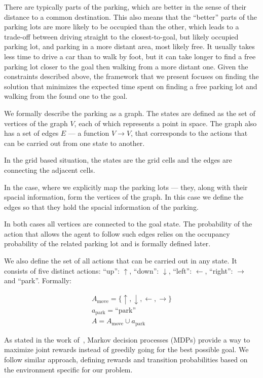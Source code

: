 There are typically parts of the parking, which are better in the sense of
their distance to a common destination. This also means that the ``better''
parts of the parking lots are more likely to be occupied than the other, which
leads to a trade-off between driving straight to the closest-to-goal, but
likely occupied parking lot, and parking in a more distant area, most likely
free. It usually takes less time to drive a car than to walk by foot, but it
can take longer to find a free parking lot closer to the goal then walking
from a more distant one. Given the constraints described above, the framework
that we present focuses on finding the solution that minimizes the expected
time spent on finding a free parking lot and walking from the found one to the
goal.

We formally describe the parking as a graph. The states are defined as the set
of vertices of the graph $V$, each of which represents a point in space. The
graph also has a set of edges $E$ --- a function $V \rightarrow V$, that
corresponds to the actions that can be carried out from one state to another.

In the grid based situation, the states are the grid cells and the edges are
connecting the adjacent cells.

In the case, where we explicitly map the parking lots --- they, along with
their spacial information, form the vertices of the graph. In this case we
define the edges so that they hold the spacial information of the parking.

In both cases all vertices are connected to the goal state. The probability of
the action that allows the agent to follow such edges relies on the occupancy
probability of the related parking lot and is formally defined later.

We also define the set of all actions that can be carried out in any state. It
consists of five distinct actions: ``up'': $\uparrow$, ``down'': $\downarrow$,
``left'': $\leftarrow$, ``right'': $\rightarrow$ and ``park''. Formally:

\begin{eqnarray}
A_{\mbox{move}} = \{ \uparrow, \downarrow, \leftarrow, \rightarrow \} \\
a_{\mbox{park}} = \mbox{``park''} \\
A = A_{\mbox{move}} \cup a_{\mbox{park}}
\end{eqnarray}

As stated in the work of~\citet{tipaldiICRA11}, Markov decision processes
(MDPs) provide a way to maximize joint rewards instead of greedily going for
the best possible goal. We follow similar approach, defining rewards and
transition probabilities based on the environment specific for our problem.

